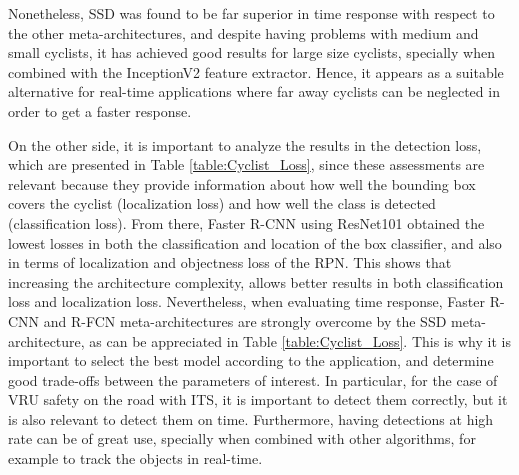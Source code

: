 \documentclass[journal]{IEEEtran}
\begin{document}
Nonetheless, SSD was found to be far superior in time response with respect to the other meta-architectures, and despite having problems with medium and small cyclists, it has achieved good results for large size cyclists, specially when combined with the InceptionV2 feature extractor. Hence, it appears as a suitable alternative for real-time applications where far away cyclists can be neglected in order to get a faster response.

On the other side, it is important to analyze the results in the detection loss, which are presented in Table \ref{table:Cyclist_Loss}, since these assessments are relevant because they provide information about how well the bounding box covers the cyclist (localization loss) and how well the class is detected (classification loss). From there, Faster R-CNN using ResNet101 obtained the lowest losses in both the classification and location of the box classifier, and also in terms of localization and objectness loss of the RPN. This shows that increasing the architecture complexity, allows better results in both classification loss and localization loss. Nevertheless, when evaluating time response, Faster R-CNN and R-FCN meta-architectures are strongly overcome by the SSD meta-architecture, as can be appreciated in Table \ref{table:Cyclist_Loss}. This is why it is important to select the best model according to the application, and determine good trade-offs between the parameters of interest. In particular, for the case of  VRU safety on the road with ITS, it is important to detect them correctly, but it is also relevant to detect them on time. Furthermore, having detections at high rate can be of great use, specially when combined with other algorithms, for example to track the objects in real-time.
\end{document}
